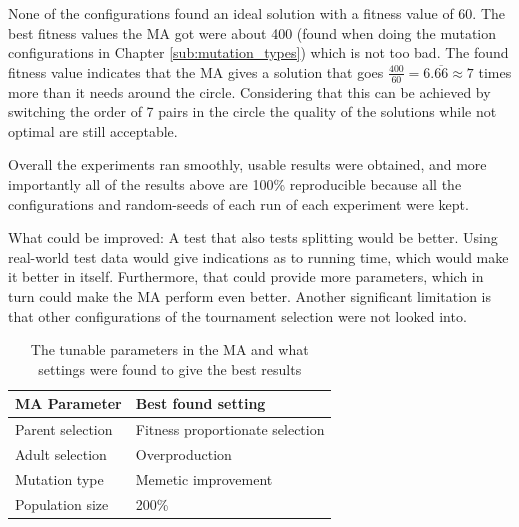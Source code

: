 None of the configurations found an ideal solution with a fitness value of 60. The best fitness values the MA got were about 400 (found when doing the mutation configurations in Chapter \ref{sub:mutation_types}) which is not too bad. The found fitness value indicates that the MA gives a solution that goes $\frac{400}{60} = 6.\overline{66} \approx 7$ times more than it needs around the circle. Considering that this can be achieved by switching the order of 7 pairs in the circle the quality of the solutions while not optimal are still acceptable.

Overall the experiments ran smoothly, usable results were obtained, and more importantly all of the results above are 100\% reproducible because all the configurations and random-seeds of each run of each experiment were kept.

What could be improved: A test that also tests splitting would be better. Using real-world test data would give indications as to running time, which would make it better in itself. Furthermore, that could provide more parameters, which in turn could make the MA perform even better. Another significant limitation is that other configurations of the tournament selection were not looked into.

{
\begin{table}[tbph]
\centering
\begin{tabular}{ll}
\toprule
\textbf{MA Parameter} & \textbf{Best found setting}     \\ \midrule
Parent selection      & Fitness proportionate selection \\
Adult selection       & Overproduction                  \\
Mutation type         & Memetic improvement             \\
Population size       & 200\%                           \\ \bottomrule
\end{tabular}
\caption{The tunable parameters in the MA and what settings were found to give the best results}
\label{tab:parameter_table}
\end{table}
}

\cleardoublepage
